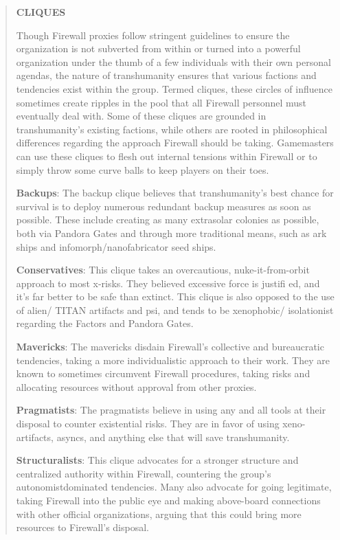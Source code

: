 \begin{quotation}
\begin{large}
\textbf{CLIQUES}
\end{large}

Though Firewall proxies follow stringent guidelines
to ensure the organization is not subverted from
within or turned into a powerful organization
under the thumb of a few individuals with their
own personal agendas, the nature of transhumanity
ensures that various factions and tendencies
exist within the group. Termed cliques, these
circles of influence sometimes create ripples in the
pool that all Firewall personnel must eventually
deal with. Some of these cliques are grounded in
transhumanity’s existing factions, while others are
rooted in philosophical differences regarding the
approach Firewall should be taking. Gamemasters
can use these cliques to flesh out internal tensions
within Firewall or to simply throw some curve balls
to keep players on their toes.

\textbf{Backups}: The backup clique believes that transhumanity’s
best chance for survival is to
deploy numerous redundant backup measures
as soon as possible. These include creating as
many extrasolar colonies as possible, both via
Pandora Gates and through more traditional
means, such as ark ships and infomorph/nanofabricator
seed ships.

\textbf{Conservatives}: This clique takes an overcautious,
nuke-it-from-orbit approach to most
x-risks. They believed excessive force is justifi
ed, and it’s far better to be safe than extinct.
This clique is also opposed to the use of alien/
TITAN artifacts and psi, and tends to be xenophobic/
isolationist regarding the Factors and
Pandora Gates.

\textbf{Mavericks}: The mavericks disdain Firewall’s collective
and bureaucratic tendencies, taking a
more individualistic approach to their work.
They are known to sometimes circumvent
Firewall procedures, taking risks and allocating
resources without approval from other
proxies.

\textbf{Pragmatists}: The pragmatists believe in using
any and all tools at their disposal to counter
existential risks. They are in favor of using
xeno-artifacts, asyncs, and anything else that
will save transhumanity.

\textbf{Structuralists}: This clique advocates for a stronger
structure and centralized authority within
Firewall, countering the group’s autonomistdominated
tendencies. Many also advocate
for going legitimate, taking Firewall into
the public eye and making above-board connections
with other official organizations,
arguing that this could bring more resources
to Firewall’s disposal.
\end{quotation}


